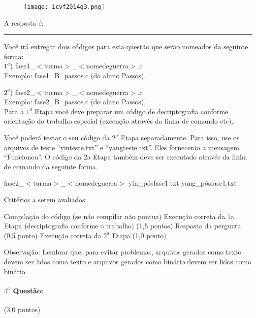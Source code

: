 \documentclass[12pt,a4paper]{article}
\begin{document}
\begin{figure}[ht]
\centering
\texttt{[image: icvf2014q3.png]}
\end{figure}

A resposta é: \rule{5cm}{0.01cm}

Você irá entregar dois códigos para esta questão que serão nomeados da seguinte forma:\\

$1^o$) fase1\_$<$turma$>$\_$<$nomedeguerra$>$.c\\ Exemplo: fase1\_B\_passos.c (do aluno Passos).

$2^o$) fase2\_$<$turma$>$\_$<$nomedeguerra$>$.c\\ Exemplo: fase2\_B\_passos.c (do aluno Passos).\\


Para a $1^a$ Etapa você deve preparar um código de decriptografia conforme orientação do
trabalho especial (execução através da linha de comando etc).

Você poderá testar o seu código da $2^a$ Etapa separadamente. Para isso, use os arquivos de
teste “yinteste.txt” e “yangteste.txt”. Eles fornecerão a mensagem “Funcionou”. O código da 2a Etapa
também deve ser executado através da linha de comando da seguinte forma.
\begin{center}
fase2\_$<$turma$>$\_$<$nomedeguerra$>$ yin\_pósfase1.txt yang\_pósfase1.txt
\end{center}

\noindent Critérios a serem avaliados:
\begin{tasks}
\task Compilação do código (se não compilar não pontua)
\task Execução correta da 1a Etapa (decriptografia conforme o trabalho) (1,5 pontos)
\task Resposta da pergunta (0,5 ponto)
\task Execução correta da $2^a$ Etapa (1,0 ponto)\\
\end{tasks}

Observação: Lembrar que, para evitar problemas, arquivos gerados como texto devem ser lidos como
texto e arquivos gerados como binário devem ser lidos como binário.

\paragraph{$4^a$ Questão:} (3,0 pontos)
\end{document}
